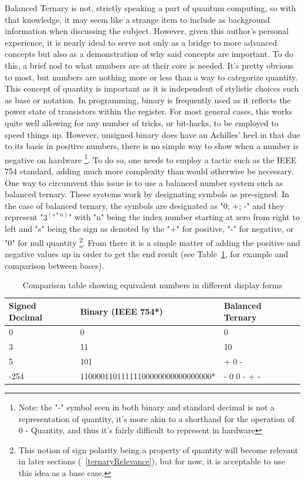 \documentclass[a4paper]{article}
\begin{document}
Balanced Ternary is not, strictly speaking a part of quantum computing, so with that knowledge, it may seem like a strange item to include as background information when discussing the subject. However, given this author's personal experience, it is nearly ideal to serve not only as a bridge to more advanced concepts but also as a demonstration of why said concepts are important. \newline
\newline
To do this, a brief nod to what numbers are at their core is needed. It's pretty obvious to most, but numbers are nothing more or less than a way to categorize quantity.  This concept of quantity is important as it is independent of stylistic choices such as base or notation.  In programming, binary is frequently used as it reflects the power state of transistors within the register.  For most general cases, this works quite well allowing for any number of tricks, or bit-hacks, to be employed to speed things up.  However, unsigned binary does have an Achilles' heel in that due to its basis in positive numbers, there is no simple way to show when a number is negative on hardware \footnote{Note: the "-" symbol seen in both binary and standard decimal is not a representation of quantity, it's more akin to a shorthand for the operation of 0 - Quantity, and thus it's fairly difficult to represent in hardware}.  To do so, one needs to employ a tactic such as the IEEE 754 standard, adding much more complexity than would otherwise be necessary.  One way to circumvent this issue is to use a balanced number system such as balanced ternary. \newline
\newline
These systems work by designating symbols as pre-signed.  In the case of balanced ternary, the symbols are designated as "0; +; -" and they represent "$3^{(s*n)}$" with "n" being the index number starting at zero from right to left and "s" being the sign as denoted by the "+" for positive, "-" for negative, or "0" for null quantity \footnote{ This notion of sign polarity being a property of quantity will become relevant in later sections (~\ref{ternaryRelevance}), but for now, it is acceptable to use this idea as a base case.}.  From there it is a simple matter of adding the positive and negative values up in order to get the end result (see Table~\ref{tab:ternary}, for example and comparison between bases).

\begin{table} %
	\centering
	\begin{tabular}{l|l|l} %
		Signed Decimal & Binary (IEEE 754*) & Balanced Ternary \\\hline %
		0 & 0 & 0 \\
		3 & 11 & 10 \\
		5 & 101 & + 0 - \\
		-254 & 11000011011111100000000000000000* & - 0 0 - + - \\ %
	\end{tabular}
	\caption{\label{tab:ternary}Comparison table showing equivalent numbers in different display forms}
\end{table}
\end{document}
